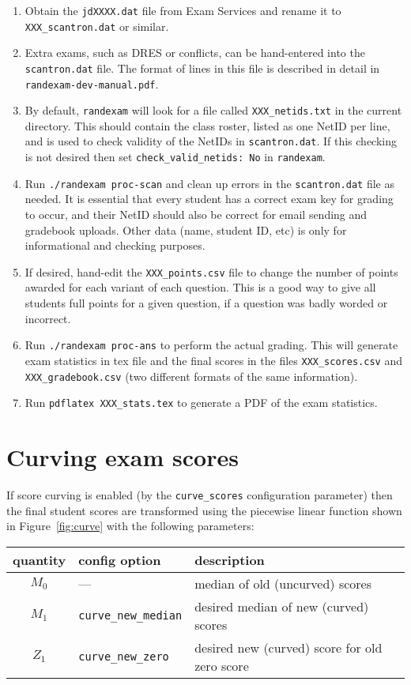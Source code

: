 \documentclass{article}
\begin{document}
\begin{enumerate}
\item Obtain the \texttt{jdXXXX.dat} file from Exam Services and
  rename it to \texttt{XXX_scantron.dat} or similar.
\item Extra exams, such as DRES or conflicts, can be hand-entered into
  the \texttt{scantron.dat} file. The format of lines in this file is
  described in detail in \texttt{randexam-dev-manual.pdf}.
\item By default, \texttt{randexam} will look for a file called
  \texttt{XXX_netids.txt} in the current directory. This should
  contain the class roster, listed as one NetID per line, and is used
  to check validity of the NetIDs in \texttt{scantron.dat}. If this
  checking is not desired then set \texttt{check_valid_netids: No}
  in \texttt{randexam}.
\item Run \texttt{./randexam proc-scan} and clean up errors in the
  \texttt{scantron.dat} file as needed. It is essential that every
  student has a correct exam key for grading to occur, and their NetID
  should also be correct for email sending and gradebook
  uploads. Other data (name, student ID, etc) is only for
  informational and checking purposes.
\item If desired, hand-edit the \texttt{XXX_points.csv} file to change the
  number of points awarded for each variant of each question. This is
  a good way to give all students full points for a given question, if
  a question was badly worded or incorrect.
\item Run \texttt{./randexam proc-ans} to perform the actual
  grading. This will generate exam statistics in tex file and the
  final scores in the files \texttt{XXX_scores.csv} and
  \texttt{XXX_gradebook.csv} (two different formats of the same
  information).
\item Run \texttt{pdflatex XXX_stats.tex} to generate a PDF of the
  exam statistics.
\end{enumerate}

\section{Curving exam scores}

If score curving is enabled (by the \texttt{curve_scores}
configuration parameter) then the final student scores are transformed
using the piecewise linear function shown in Figure~\ref{fig:curve}
with the following parameters:
\begin{center}
  \begin{tabular}{cll}
    quantity & config option & description \\
    \hline
    $M_0$ & --- & median of old (uncurved) scores \\
    $M_1$ & \texttt{curve_new_median} & desired median of new (curved) scores \\
    $Z_1$ & \texttt{curve_new_zero} & desired new (curved) score for old zero score
  \end{tabular}
\end{center}
\end{document}
